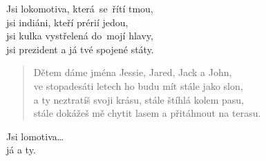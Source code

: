 \begin{song}{}
\begin{refren}
   Jsi lokomotiva, která~se~řítí tmou,  \\
   jsi indiáni, kteří prérií jedou, \\
   jsi kulka vystřelená do~mojí hlavy,      \\
   jsi prezident a já tvé spojené státy. 
\end{refren}
\begin{verse}
  Dětem dáme jména Jessie, Jared, Jack a John,  \\
   ve stopadesáti letech ho budu mít stále jako slon,  \\
   a ty neztratíš svoji krásu, stále štíhlá kolem pasu,  \\
   stále dokážeš mě chytit lasem a přitáhnout na terasu. 
\end{verse}
\begin{refren}
   Jsi lomotiva\ldots {} \\
   já a ty.
\end{refren}
\end{song}
\pagebreak
